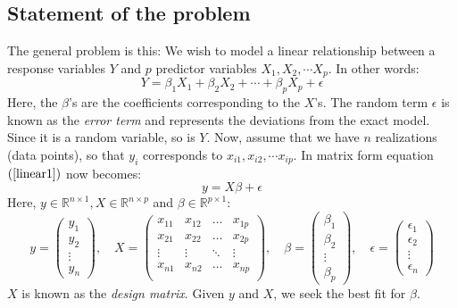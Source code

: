 \documentclass[12pt, a4paper]{article}
\numberwithin{equation}{section}
\begin{document}
\subsection{Statement of the problem}
The general problem is this: We wish to model a linear relationship between a response variables $Y$ and $p$ predictor variables $X_1, X_2,\cdots X_p$. In other words:
\begin{equation}
\label{linear1}
Y=\beta_1 X_1 + \beta_2 X_2 + \cdots + \beta_p X_p+\epsilon
\end{equation}
Here, the $\beta$'s are the coefficients corresponding to the $X$'s. The random term $\epsilon$ is known as the \textit{error term} and represents the deviations from the exact model. Since it is a random variable, so is $Y$. Now, assume that we have $n$ realizations (data points), so that $y_i$ corresponds to $x_{i1}, x_{i2},\cdots x_{ip}$. In matrix form equation $(\ref{linear1})$ now becomes: 
\begin{equation}
\label{linear2}
y=X\beta+\epsilon
\end{equation}
Here, $y\in\mathbb{R}^{n\times 1}, X\in\mathbb{R}^{n\times p}$ and $\beta\in\mathbb{R}^{p\times 1}$:
\begin{equation}
y = 
\begin{pmatrix}
	y_1 \\ y_2 \\ \vdots \\ y_n
\end{pmatrix},\quad
X =
\begin{pmatrix}
	x_{11} 	& x_{12} 	& \ldots	& x_{1p} \\
	x_{21} 	& x_{22} 	& \ldots	& x_{2p} \\
	\vdots	& \vdots	& \ddots	& \vdots \\
	x_{n1} 	& x_{n2} 	& \ldots	& x_{np} \\
\end{pmatrix},\quad
\beta =
\begin{pmatrix}
	\beta_1	\\ \beta_2	\\ \vdots\\	\beta_p 
\end{pmatrix},\quad
\epsilon = 
\begin{pmatrix}
	\epsilon_1 \\ \epsilon_2 \\ \vdots \\ \epsilon_n
\end{pmatrix}
\end{equation}
$X$ is known as the \textit{design matrix}. Given $y$ and $X$, we seek the best fit for $\beta$.
\end{document}
